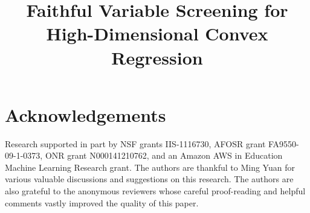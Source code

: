 \documentclass[12pt,pdftex,aos,noinfoline,addressasfootnote]{imsart}
\begin{document}
\begin{frontmatter}
\title{Faithful Variable Screening for\\ High-Dimensional Convex Regression}


 
\vskip20pt 
\end{frontmatter}

\maketitle

\vskip10pt










%


\section*{Acknowledgements}
Research supported in part by NSF grants IIS-1116730, 
AFOSR grant FA9550-09-1-0373, ONR grant
N000141210762, and an Amazon AWS in Education Machine Learning
Research grant. The authors are thankful to Ming Yuan for various valuable discussions and suggestions on this research. The authors are also grateful to the anonymous reviewers whose careful proof-reading and helpful comments vastly improved the quality of this paper. 





 
\end{document}
